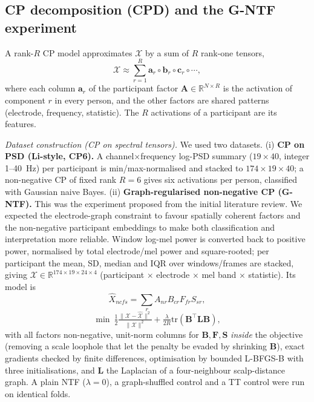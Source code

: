 \documentclass[10pt,twocolumn,a4paper]{article}
\begin{document}
\subsection{CP decomposition (CPD) and the G-NTF experiment}
\label{sec:cp}
A rank-$R$ CP model approximates $\mathcal X$ by a sum of $R$ rank-one tensors,
\begin{equation}
\mathcal X\approx\sum_{r=1}^{R}\mathbf a_r\circ\mathbf b_r\circ\mathbf c_r\circ\cdots,
\end{equation}
where each column $\mathbf a_r$ of the participant factor $\mathbf A\in\mathbb R^{N\times R}$ is the activation of component $r$ in every person, and the other factors are shared patterns (electrode, frequency, statistic). The $R$ activations of a participant are its features.

\emph{Dataset construction (CP on spectral tensors).} We used two datasets.
(i) \textbf{CP on PSD (Li-style, CP6).} A channel$\times$frequency log-PSD summary ($19\times40$, integer 1--40~Hz) per participant is min/max-normalised and stacked to $174\times19\times40$; a non-negative CP of fixed rank $R{=}6$ gives six activations per person, classified with Gaussian naive Bayes.
(ii) \textbf{Graph-regularised non-negative CP (G-NTF).} This was the experiment proposed from the initial literature review. We expected the electrode-graph constraint to favour spatially coherent factors and the non-negative participant embeddings to make both classification and interpretation more reliable. Window log-mel power is converted back to positive power, normalised by total electrode/mel power and square-rooted; per participant the mean, SD, median and IQR over windows/frames are stacked, giving $\mathcal X\in\mathbb R^{174\times19\times24\times4}$ (participant $\times$ electrode $\times$ mel band $\times$ statistic). Its model is
\begin{equation}
\hat X_{ncfs}=\sum_{r}A_{nr}B_{cr}F_{fr}S_{sr},
\end{equation}
\begin{equation}
\min\ \tfrac12\tfrac{\|\mathcal X-\hat{\mathcal X}\|^2}{\|\mathcal X\|^2}+\tfrac{\lambda}{2R}\mathrm{tr}(\mathbf B^{\!\top}\mathbf L\mathbf B),
\end{equation}
with all factors non-negative, unit-norm columns for $\mathbf B,\mathbf F,\mathbf S$ \emph{inside} the objective (removing a scale loophole that let the penalty be evaded by shrinking $\mathbf B$), exact gradients checked by finite differences, optimisation by bounded L-BFGS-B with three initialisations, and $\mathbf L$ the Laplacian of a four-neighbour scalp-distance graph. A plain NTF ($\lambda{=}0$), a graph-shuffled control and a TT control were run on identical folds.
\end{document}
